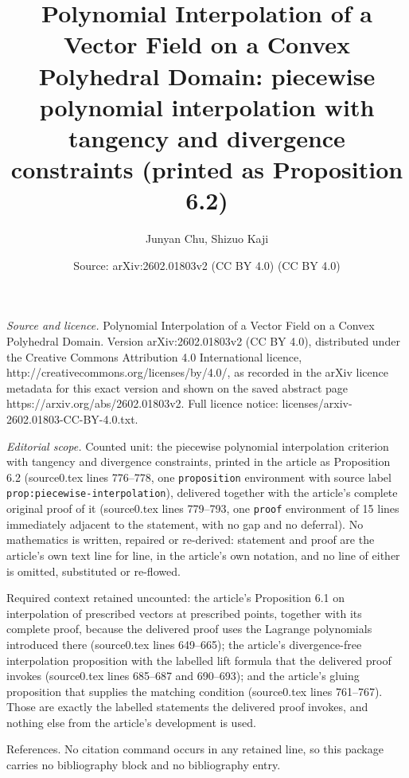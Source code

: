 \documentclass[10pt,a4paper]{amsart}
\title[Polynomial Interpolation of a Vector Field on a Convex Polyhedral Domain]{Polynomial Interpolation of a Vector Field on a Convex Polyhedral Domain: piecewise polynomial interpolation with tangency and divergence constraints (printed as Proposition 6.2)}
\author{Junyan Chu, Shizuo Kaji}
\date{Source: arXiv:2602.01803v2 (CC BY 4.0) (CC BY 4.0)}
\theoremstyle{plain}
\theoremstyle{definition}
\theoremstyle{remark}
\begin{document}
\maketitle

\noindent\emph{Source and licence.} Polynomial Interpolation of a Vector Field on a Convex Polyhedral Domain. Version arXiv:2602.01803v2 (CC BY 4.0), distributed under the Creative Commons Attribution 4.0 International licence, http://creativecommons.org/licenses/by/4.0/, as recorded in the arXiv licence metadata for this exact version and shown on the saved abstract page https://arxiv.org/abs/2602.01803v2. Full licence notice: licenses/arxiv-2602.01803-CC-BY-4.0.txt.\par\smallskip

\noindent\textit{Editorial scope.} Counted unit: the piecewise polynomial interpolation criterion with tangency and divergence constraints, printed in the article as Proposition 6.2 (source0.tex lines 776--778, one \texttt{proposition} environment with source label \texttt{prop:piecewise-interpolation}), delivered together with the article's complete original proof of it (source0.tex lines 779--793, one \texttt{proof} environment of 15 lines immediately adjacent to the statement, with no gap and no deferral). No mathematics is written, repaired or re-derived: statement and proof are the article's own text line for line, in the article's own notation, and no line of either is omitted, substituted or re-flowed.

Required context retained uncounted: the article's Proposition 6.1 on interpolation of prescribed vectors at prescribed points, together with its complete proof, because the delivered proof uses the Lagrange polynomials introduced there (source0.tex lines 649--665); the article's divergence-free interpolation proposition with the labelled lift formula that the delivered proof invokes (source0.tex lines 685--687 and 690--693); and the article's gluing proposition that supplies the matching condition (source0.tex lines 761--767). Those are exactly the labelled statements the delivered proof invokes, and nothing else from the article's development is used.

References. No citation command occurs in any retained line, so this package carries no bibliography block and no bibliography entry.
\end{document}
